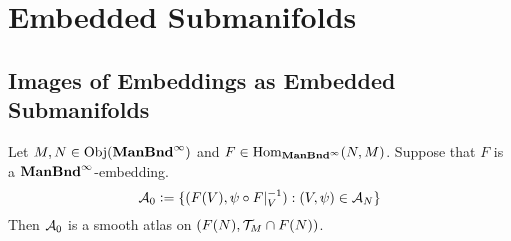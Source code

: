 \documentclass{book}
\begin{document}
	\newpage
	\section{Embedded Submanifolds}
	
	\subsection{Images of Embeddings as Embedded Submanifolds}
	
	\begin{ex} 
		Let $M, N \in \operatorname{Obj}(\operatorname*{\text{\textbf{ManBnd}}^{\infty}})$ and  $F \in \operatorname{Hom}_{\operatorname*{\text{\textbf{ManBnd}}^{\infty}}}(N, M)$. Suppose that $F$ is a  $\operatorname*{\text{\textbf{ManBnd}}^{\infty}}$-embedding. 
		$$\mathcal{A}_0 \vcentcolon= \{(F(V), \psi \circ F|_V^{-1}): (V, \psi) \in \mathcal{A}_N\}$$
		Then $\mathcal{A}_0$ is a smooth atlas on $(F(N), \mathcal{T}_M \cap F(N))$.
	\end{ex}
	
\end{document}
